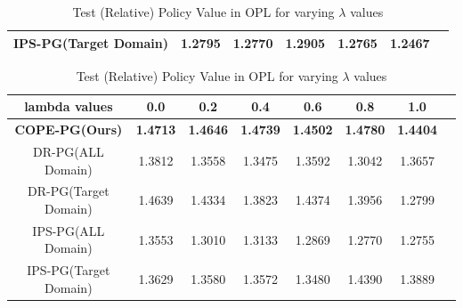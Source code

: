 \begin{table}[h]
\begin{minipage}{\textwidth}
\begin{tabular}{c|cccccc}
        IPS-PG(Target Domain)    & 1.2795 & 1.2770 & 1.2905 & 1.2765 & 1.2467 \\
        \bottomrule
    \end{tabular}
    \label{table:opl-deterministic-logging}
    \vspace{-2pt}
\end{minipage}
\begin{minipage}{\textwidth}
    \centering
    \caption{Test (Relative) Policy Value in OPL for varying $\lambda$ values} \vspace{1mm}
    \begin{tabular}{c|ccccccc}
        \toprule
        lambda values   & 0.0    &  0.2    & 0.4  & 0.6 & 0.8 & 1.0 \\
        \midrule\midrule
        \textbf{COPE-PG(Ours)}      & \textbf{1.4713}    & \textbf{1.4646}    & \textbf{1.4739}    & \textbf{1.4502}    & \textbf{1.4780} & \textbf{1.4404} \\
        DR-PG(ALL Domain)   &  1.3812    & 1.3558    & 1.3475    & 1.3592    & 1.3042    & 1.3657\\
        DR-PG(Target Domain)  & 1.4639    & 1.4334    & 1.3823    & 1.4374    & 1.3956    & 1.2799\\
        IPS-PG(ALL Domain)  & 1.3553    & 1.3010    & 1.3133    & 1.2869    & 1.2770    & 1.2755 \\
        IPS-PG(Target Domain)  & 1.3629    & 1.3580    & 1.3572    & 1.3480    & 1.4390    & 1.3889 \\
        \bottomrule
    \end{tabular}
    \label{table:opl-lambda}
    \vspace{-2pt}
\end{minipage}
\end{table}
